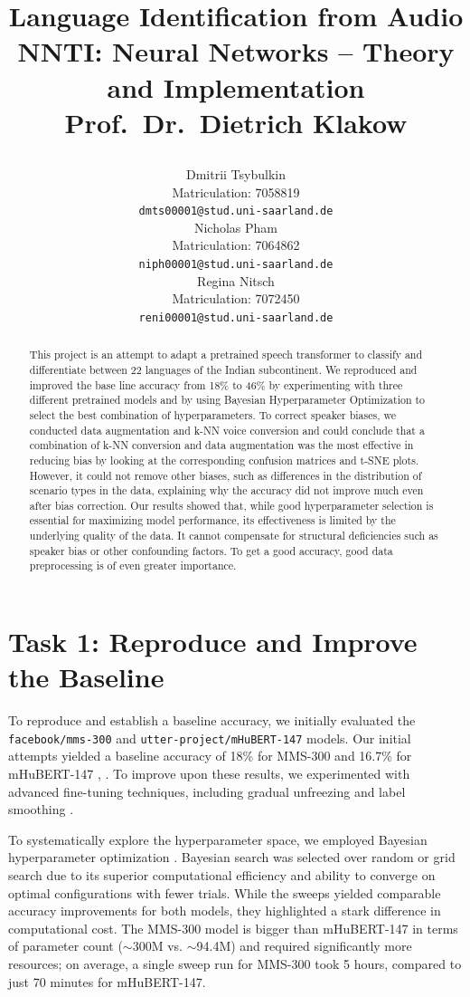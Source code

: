 \documentclass[11pt]{article}
\title{
\textbf{Language Identification from Audio} \\
\large NNTI: Neural Networks -- Theory and Implementation \\
Prof.~Dr.~Dietrich Klakow


\author{Dmitrii Tsybulkin \\
  Matriculation: 7058819 \\
  \texttt{dmts00001@stud.uni-saarland.de} \\\And
  Nicholas Pham \\
  Matriculation: 7064862 \\
  \texttt{niph00001@stud.uni-saarland.de} \\\AND
  Regina Nitsch \\
  Matriculation: 7072450 \\
  \texttt{reni00001@stud.uni-saarland.de}
  }
}
\begin{document}
\maketitle
\begin{abstract}
This project is an attempt to adapt a pretrained speech transformer to classify and differentiate between 22 languages of the Indian subcontinent. We reproduced and improved the base line accuracy from 18\% to 46\% by experimenting with three different pretrained models and by using Bayesian Hyperparameter Optimization to select the best combination of hyperparameters. To correct speaker biases, we conducted data augmentation and k-NN voice conversion and could conclude that a combination of k-NN conversion and data augmentation was the most effective in reducing bias by looking at the corresponding confusion matrices and t-SNE plots. However, it could not remove other biases, such as differences in the distribution of scenario types in the data, explaining why the accuracy did not improve much even after bias correction. Our results showed that, while good hyperparameter selection is essential for maximizing model performance, its effectiveness is limited by the underlying quality of the data. It cannot compensate for structural deficiencies such as speaker bias or other confounding factors. To get a good accuracy, good data preprocessing is of even greater importance.
\end{abstract}

\section{Task 1: Reproduce and Improve the Baseline}
To reproduce and establish a baseline accuracy, we initially evaluated the \texttt{facebook/mms-300} \citep{pratap2023mms} and \texttt{utter-project/mHuBERT-147} \citep{boito2024mhubert} models. Our initial attempts yielded a baseline accuracy of 18\% for MMS-300 and 16.7\% for mHuBERT-147 \citep{Code_mms300_baseline}, \citep{Code_hubert_baseline}. To improve upon these results, we experimented with advanced fine-tuning techniques, including gradual unfreezing and label smoothing \citep{llm_fine_tuning}.

To systematically explore the hyperparameter space, we employed Bayesian hyperparameter optimization \citep{Code_sweeps}. Bayesian search was selected over random or grid search due to its superior computational efficiency and ability to converge on optimal configurations with fewer trials. While the sweeps yielded comparable accuracy improvements for both models, they highlighted a stark difference in computational cost. The MMS-300 model is bigger than mHuBERT-147 in terms of parameter count ($\sim$300M vs. $\sim$94.4M) and required significantly more resources; on average, a single sweep run for MMS-300 took 5 hours, compared to just 70 minutes for mHuBERT-147.
\end{document}
